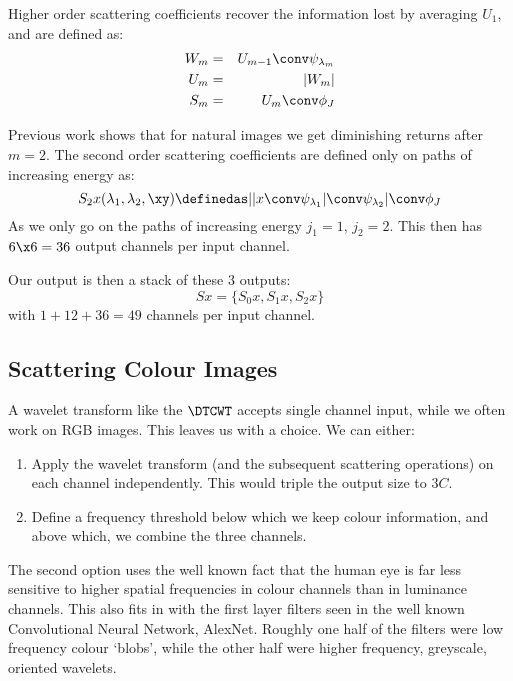 Higher order scattering coefficients recover the information lost by
averaging $U_1$, and are defined as:
\begin{eqnarray}
  W_{m} &=& U_{m-1} \conv \psi_{\lambda_{m}} \\
  U_{m} &=& |W_{m}| \\
  S_{m} &=& U_m \conv \phi_J
\end{eqnarray}

Previous work shows that for natural images we get diminishing returns after
$m=2$. The second order scattering coefficients are defined only on paths of
increasing energy\cite{bruna_invariant_2013} as:
\begin{equation}
  S_2x(\lambda_1, \lambda_2, \xy) \definedas ||x \conv \psi_{\lambda_1}|
  \conv \psi_{\lambda_2}| \conv \phi_J
\end{equation}
As we only go on the paths of increasing energy $j_1 = 1$, $j_2=2$. This then
has $6\x6 = 36$ output channels per input channel.

Our output is then a stack of these 3 outputs:
\begin{equation}
  Sx = \{S_0x, S_1x, S_2x\}
\end{equation}
with $1+12+36=49$ channels per input channel.

\subsection{Scattering Colour Images}\label{sec:ch4:colour}
A wavelet transform like the $\DTCWT$ accepts single channel input, while we
often work on RGB images. This leaves us with a choice. We can either:
\begin{enumerate}
  \item Apply the wavelet transform (and the subsequent scattering operations)
    on each channel independently. This would triple the output size to $3C$.
  \item Define a frequency threshold below which we keep colour information, and
    above which, we combine the three channels.
\end{enumerate}
The second option uses the well known fact that the human eye is far less sensitive 
to higher spatial frequencies in colour channels than in luminance channels. 
This also fits in with the first layer filters seen in the well known
Convolutional Neural Network, AlexNet. Roughly one half of the filters were low
frequency colour `blobs', while the other half were higher frequency, greyscale,
oriented wavelets. 

